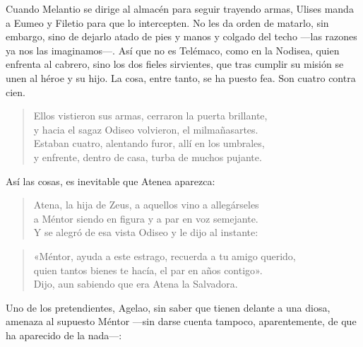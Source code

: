 Cuando Melantio se dirige al almacén para seguir trayendo armas, Ulises manda a Eumeo y Filetio para que lo intercepten. No les da orden de matarlo, sin embargo, sino de dejarlo atado de pies y manos y colgado del techo ---las razones ya nos las imaginamos---. Así que no es Telémaco, como en la Nodisea, quien enfrenta al cabrero, sino los dos fieles sirvientes, que tras cumplir su misión se unen al héroe y su hijo. La cosa, entre tanto, se ha puesto fea. Son cuatro contra cien.

\begin{verse}
Ellos vistieron sus armas, cerraron la puerta brillante,\\
y hacia el sagaz Odiseo volvieron, el milmañasartes.\\
Estaban cuatro, alentando furor, allí en los umbrales,\\
y enfrente, dentro de casa, turba de muchos pujante.
\end{verse}

Así las cosas, es inevitable que Atenea aparezca:

\begin{verse}
Atena, la hija de Zeus, a aquellos vino a allegárseles\\
a Méntor siendo en figura y a par en voz semejante.\\
Y se alegró de esa vista Odiseo y le dijo al instante:
\end{verse}

\begin{verse}
«Méntor, ayuda a este estrago, recuerda a tu amigo querido,\\
quien tantos bienes te hacía, el par en años contigo».\\
Dijo, aun sabiendo que era Atena la Salvadora.
\end{verse}

Uno de los pretendientes, Agelao, sin saber que tienen delante a una diosa, amenaza al supuesto Méntor ---sin darse cuenta tampoco, aparentemente, de que ha aparecido de la nada---:

